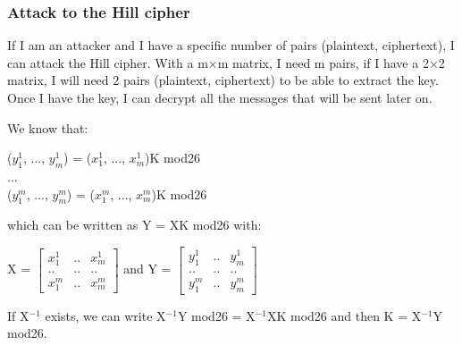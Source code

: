 \documentclass[a4paper, 12pt]{report}
\begin{document}
\subsubsection{Attack to the Hill cipher}
If I am an attacker and I have a specific number of pairs (plaintext, ciphertext), I can attack the Hill cipher. With a m$\times$m matrix, I need m pairs, if I have a 2$\times$2 matrix, I will need 2 pairs (plaintext, ciphertext) to be able to extract the key. Once I have the key, I can decrypt all the messages that will be sent later on.

We know that:
\begin{center}
	($y_1^1$, ..., $y_m^1$) = ($x_1^1$, ..., $x_m^1$)K mod26\\
	...\\
	($y_1^m$, ..., $y_m^m$) = ($x_1^m$, ..., $x_m^m$)K mod26\\
\end{center}
which can be written as Y = XK mod26 with:
\begin{center}
	X = $\begin{bmatrix}
		x_1^1 & .. & x_m^1\\
		.. & .. & ..\\
		x_1^m & .. & x_m^m	
	\end{bmatrix}$ and Y = $
	\begin{bmatrix}
		y_1^1 & .. & y_m^1\\
		.. & .. & ..\\
		y_1^m & .. & y_m^m	
	\end{bmatrix}$
\end{center}

If X$^{-1}$ exists, we can write X$^{-1}$Y mod26 = X$^{-1}$XK mod26 and then K = X$^{-1}$Y mod26.
\end{document}
